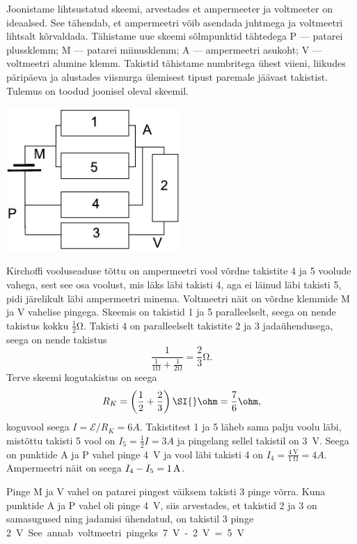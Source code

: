 \documentclass[11pt, twoside]{article}
\begin{document}
{{\ifSolution
Joonistame lihtsustatud skeemi, arvestades et ampermeeter ja voltmeeter 
on ideaalsed. See tähendab, et ampermeetri võib asendada juhtmega ja 
voltmeetri lihtsalt kõrvaldada. Tähistame uue skeemi sõlmpunktid 
tähtedega P --- patarei plussklemm; M --- patarei miinusklemm; A --- 
ampermeetri asukoht; V --- voltmeetri alumine klemm. Takistid tähistame 
numbritega ühest viieni, liikudes päripäeva ja alustades viisnurga 
ülemisest tipust paremale jäävast takistist. Tulemus on toodud joonisel 
oleval skeemil.
\begin{center}
	\includegraphics[width=0.5\textwidth]{2017-v3g-06-viisnurk-lah}
\end{center}
Kirchoffi vooluseaduse tõttu on ampermeetri vool võrdne 
takistite 4 ja 5 voolude vahega, sest see osa voolust, mis läks läbi takisti 4, aga ei läinud läbi takisti 5, pidi järelikult läbi ampermeetri minema. Voltmeetri näit on võrdne klemmide 
M ja V vahelise pingega.
Skeemis on takistid 1 ja 5 paralleelselt, seega on nende takistus kokku $\frac12 \si{\ohm}$. Takisti 4 on paralleelselt 
takistite 2 ja 3 jadaühendusega, seega on nende takistus
$$\frac{1}{\frac{1}{1\si{\ohm}}+\frac{1}{2\si{\ohm}}} = \frac 23 \si{\ohm}. $$
Terve skeemi kogutakistus on seega
\[
R_K=\left(\frac 12 + 
\frac 23\right)\SI{}\ohm=\frac 76\ohm,
\]
koguvool seega $I=\mathcal 
E/R_K=\SI{6}A$. Takistitest 1 ja 5 läheb sama palju voolu läbi,
mistõttu takisti 5 vool on $I_5=\frac 12 I=\SI{3}A$ ja pingelang sellel takistil on \SI{3}{\volt}. Seega on punktide A ja P vahel pinge \SI{4}{\volt} ja vool läbi takisti 4 
on $I_4=\frac{\SI{4}{\volt}}{\SI{1}{\ohm}}=\SI{4}A$. Ampermeetri
näit on seega $I_4-I_5=\SI 1A$.

Pinge M ja V vahel on patarei pingest väiksem takisti 3 pinge võrra. Kuna punktide A ja P vahel oli pinge \SI{4}{\volt}, siis arvestades, et takistid 2 ja 3 on samasugused ning jadamisi ühendatud, on takistil 3 pinge \SI{2}V. 
See annab voltmeetri pingeks
\SI{7}V -\SI{2}V= \SI{5}V.
\fi
}

}
\end{document}
